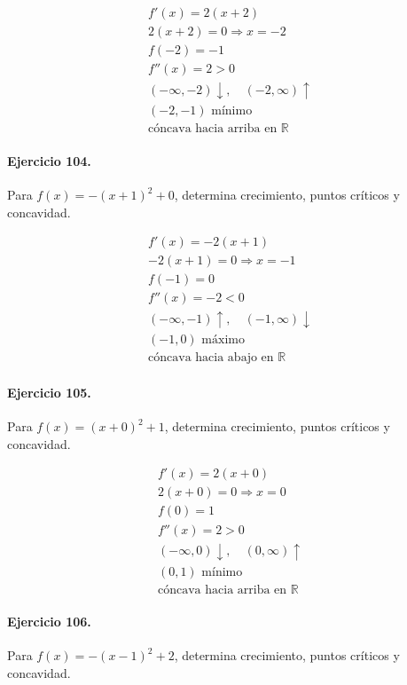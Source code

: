 \documentclass[11pt,a4paper]{article}
\begin{document}
\[
\begin{aligned}
f'(x)=2(x+2)\\
2(x+2)=0\Rightarrow x=-2\\
f(-2)=-1\\
f''(x)=2>0\\
(-\infty,-2)\downarrow,\quad(-2,\infty)\uparrow\\
(-2,-1)\text{ mínimo}\\
\text{{cóncava hacia arriba en }}\mathbb{R}
\end{aligned}
\]


\paragraph{Ejercicio 104.} Para $f(x)=-(x+1)^2+0$, determina crecimiento, puntos críticos y concavidad.

\[
\begin{aligned}
f'(x)=-2(x+1)\\
-2(x+1)=0\Rightarrow x=-1\\
f(-1)=0\\
f''(x)=-2<0\\
(-\infty,-1)\uparrow,\quad(-1,\infty)\downarrow\\
(-1,0)\text{ máximo}\\
\text{{cóncava hacia abajo en }}\mathbb{R}
\end{aligned}
\]


\paragraph{Ejercicio 105.} Para $f(x)=(x+0)^2+1$, determina crecimiento, puntos críticos y concavidad.

\[
\begin{aligned}
f'(x)=2(x+0)\\
2(x+0)=0\Rightarrow x=0\\
f(0)=1\\
f''(x)=2>0\\
(-\infty,0)\downarrow,\quad(0,\infty)\uparrow\\
(0,1)\text{ mínimo}\\
\text{{cóncava hacia arriba en }}\mathbb{R}
\end{aligned}
\]


\paragraph{Ejercicio 106.} Para $f(x)=-(x-1)^2+2$, determina crecimiento, puntos críticos y concavidad.
\end{document}
